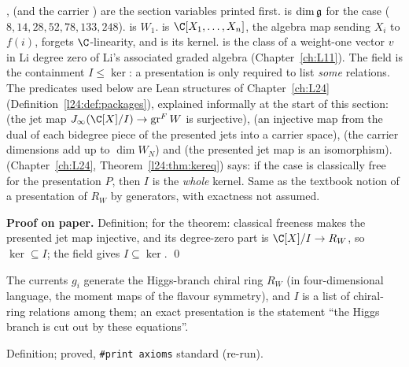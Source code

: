 \begin{dictionary}
,  (and the carrier ) are the section variables printed first.  is
$\dim\mathfrak g$ for the case ($8,14,28,52,78,133,248$).  is $W_1$.  is
$\C[X_1,\dots,X_n]$,  the algebra map sending $X_i$ to $f(i)$,  forgets $\C$-linearity, and
 is its kernel.  is the class of a weight-one vector $v$ in Li degree zero of Li's
associated graded algebra (Chapter~\ref{ch:L11}). The field  is the containment $I\le\ker$: a presentation is only required to
list \emph{some} relations.
The predicates used below are Lean structures of Chapter~\ref{ch:L24} (Definition~\ref{l24:def:packages}), explained informally at the
start of this section:  (the jet map $J_\infty(\C[X]/I)\to\operatorname{gr}^FW$ is surjective),
 (an injective map from the dual of each bidegree piece of the presented jets into a carrier space),
 (the carrier dimensions add up to $\dim W_N$) and  (the presented
jet map is an isomorphism).  (Chapter~\ref{ch:L24}, Theorem~\ref{l24:thm:kereq}) says: if the case is classically free for the presentation $P$, then $I$ is the \emph{whole} kernel. Same as the textbook
notion of a presentation of $R_W$ by generators, with exactness not assumed.
\end{dictionary}

\textbf{Proof on paper.} Definition; for the theorem: classical freeness makes the presented jet map injective, and its degree-zero
part is $\C[X]/I\to R_W$, so $\ker\subseteq I$; the field  gives $I\subseteq\ker$. \qed

\begin{physics}
The currents $g_i$ generate the Higgs-branch chiral ring $R_W$ (in four-dimensional language, the moment maps of the flavour symmetry), and
$I$ is a list of chiral-ring relations among them; an exact presentation is the statement ``the Higgs branch is cut out by these
equations''.
\end{physics}

\begin{status}
Definition;  proved, \texttt{\#print axioms} standard (re-run).
\end{status}

